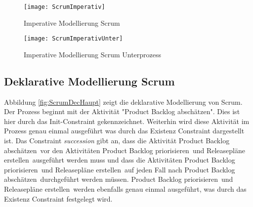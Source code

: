 \begin{sidewaysfigure}[htp]
\begin{center}
  \texttt{[image: ScrumImperativ]} %
  \caption{Imperative Modellierung Scrum}
  \label{fig:ScrumImperativ}
\end{center}
\end{sidewaysfigure}

\begin{figure}[htp]
\begin{center}
  \texttt{[image: ScrumImperativUnter]} %
  \caption{Imperative Modellierung Scrum Unterprozess}
  \label{fig:ScrumImperativUnter}
\end{center}
\end{figure}
\clearpage

\subsection{Deklarative Modellierung Scrum}

Abbildung \ref{fig:ScrumDecHaupt} zeigt die deklarative Modellierung von Scrum. Der Prozess beginnt mit der Aktivität "Product Backlog abschätzen". Dies ist hier durch das Init-Constraint gekennzeichnet. Weiterhin wird diese Aktivität im Prozess genau einmal ausgeführt was durch das Existenz Constraint dargestellt ist. Das Constraint \textit{succession} gibt an, dass die Aktivität \grqq Product Backlog abschätzen\grqq \ vor den Aktivitäten \grqq Product Backlog priorisieren\grqq \ und \grqq Releasepläne erstellen\grqq \ ausgeführt werden muss und dass die Aktivitäten \grqq Product Backlog priorisieren\grqq \ und \grqq Releasepläne erstellen\grqq \ auf jeden Fall nach \grqq Product Backlog abschätzen\grqq \ durchgeführt werden müssen. \grqq Product Backlog priorisieren\grqq \ und \grqq Releasepläne erstellen\grqq \ werden ebenfalls genau einmal ausgeführt, was durch das Existenz Constraint festgelegt wird.  \newline

